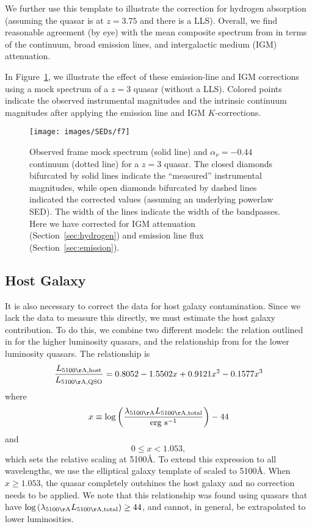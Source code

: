 We further use this template to illustrate the correction for hydrogen absorption (assuming the quasar is at $z=3.75$ and there is a LLS).  Overall, we find reasonable agreement (by eye) with the mean composite spectrum from \citet{Vanden-Berk:2001} in terms of the continuum, broad emission lines, and intergalactic medium (IGM) attenuation.

In Figure~\ref{mock}, we illustrate the effect of these emission-line and IGM corrections using a mock spectrum of a $z=3$ quasar (without a LLS).  Colored points indicate the observed instrumental magnitudes and the intrinsic continuum magnitudes after applying the emission line and IGM $K$-corrections.  

\begin{figure}[t]
 \centering
 \texttt{[image: images/SEDs/f7]}
 \caption[Mock photometry]{Observed frame mock spectrum (solid line) and $\alpha_{\nu}=-0.44$ continuum (dotted line) for a $z=3$ quasar.  The closed diamonds bifurcated by solid lines indicate the ``measured'' instrumental magnitudes, while open diamonds bifurcated by dashed lines indicated the corrected values (assuming an underlying powerlaw SED).  The width of the lines indicate the width of the bandpasses.   Here we have corrected for IGM attenuation (Section~\ref{sec:hydrogen}) and emission line flux (Section~\ref{sec:emission}).
}
 \label{mock}
\end{figure}

\subsection{Host Galaxy}
\label{sec:host}

It is also necessary to correct the data for host galaxy contamination.  Since we lack the data to measure this directly, we must estimate the host galaxy contribution.  To do this, we combine two different models: the relation outlined in \citet{Shen:2011} for the higher luminosity quasars, and the relationship from \citet{Richards:2006} for the lower luminosity quasars.  The \citet{Shen:2011} relationship is
\begin{equation}
 \frac{L_{5100{\rm \AA,host}}}{L_{5100{\rm \AA,QSO}}}=0.8052-1.5502x+0.9121x^2-0.1577x^3 
 \end{equation}
 \normalsize
 where
 \small
 \begin{equation}
 x \equiv \log{ \left( \frac{\lambda_{5100{\rm \AA}} L_{5100{\rm \AA},{\rm total}}}{\mbox{erg s}^{-1}} \right) } - 44 \nonumber
 \end{equation}
 \normalsize
 and
 \small
 \begin{equation}
 0 \leq x < 1.053, \nonumber
\end{equation}
which sets the relative scaling at 5100\AA. To extend this expression to all wavelengths, we use the elliptical galaxy template of \citet{Fioc:1997} scaled to 5100\AA.  When $x \geq 1.053$, the quasar completely outshines the host galaxy and no correction needs to be applied.  We note that this relationship was found using quasars that have $\log{(\lambda_{5100{\rm \AA}} L_{5100{\rm \AA},{\rm total}})} \geq 44$, and cannot, in general, be extrapolated to lower luminosities.

